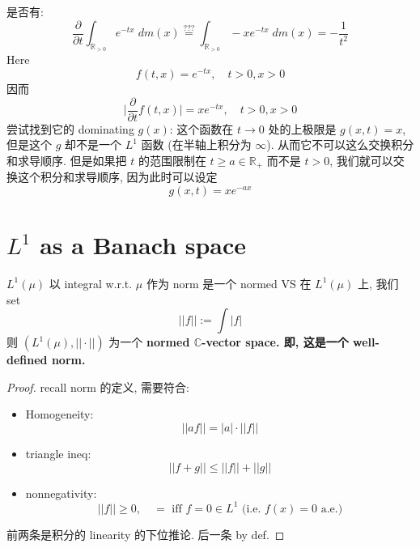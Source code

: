 \documentclass[lang=cn,11pt]{elegantbook}
\begin{document}
\begin{example}
是否有: \[
    \frac{\partial}{\partial t} \int_{\mathbb{R}_{> 0}} e^{-tx} \; dm(x)  \overset{???}{=} \int_{\mathbb{R}_{> 0}} -x e^{-tx} \; dm(x)   = -\frac{1}{t^2} 
    \]
Here \[
f(t,x) = e^{-tx}, \quad t>0, x>0
\] 因而 \[
\bigg| \frac{\partial}{\partial t} f(t,x) \bigg|=  xe^{-tx}, \quad t> 0 , x> 0
\]
尝试找到它的 dominating $g(x)$: 这个函数在 $t \to 0$ 处的上极限是 $g(x,t) = x$, 但是这个 $g$ 却不是一个 $L^1$ 函数 (在半轴上积分为 $\infty$). 从而它不可以这么交换积分和求导顺序. 但是如果把 $t$ 的范围限制在 $t \geq a \in \mathbb{R}_+$ 而不是 $t>0$, 我们就可以交换这个积分和求导顺序, 因为此时可以设定 \[
g(x,t)  = xe^{-ax}
\]
\end{example}




\section{$L^1$ as a Banach space}
\begin{theorem}{$L^1(\mu)$ 以 integral w.r.t. $\mu$ 作为 norm 是一个 normed VS}  在 $L^1(\mu)$ 上, 我们 set \[
||f||  := \int |f|
\]
    则 $(L^1(\mu), ||\cdot||)$ 为一个 \textbf{normed $\mathbb{C}$-vector space. 即, 这是一个 well-defined norm.}
\end{theorem}
\begin{proof}
    recall norm 的定义, 需要符合: \begin{itemize}
        \item Homogeneity: \[
        ||af|| = |a|\cdot ||f||
        \]
        \item triangle ineq: \[
        ||f+g|| \leq ||f|| + ||g||
        \]
        \item nonnegativity: \[
        ||f|| \geq 0,\quad = \text{ iff  } f=0 \in L^1 \text{ (i.e. } f(x) = 0 \text{ a.e.)}
        \]
    \end{itemize}
前两条是积分的 linearity 的下位推论. 后一条 by def.
\end{proof}
\end{document}
